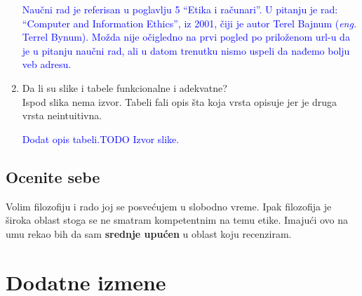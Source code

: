\documentclass[a4paper]{report}
\newcommand{\odgovor}[1]{\textcolor{blue}{#1}}
\begin{document}
\begin{enumerate}
\odgovor{Naučni rad je referisan u poglavlju 5 ``Etika i računari''. U pitanju je rad: ``Computer and Information Ethics'', iz 2001, čiji je autor Terel Bajnum (\textit{eng.} Terrel Bynum). Možda nije očigledno na prvi pogled po priloženom url-u da je u pitanju naučni rad, ali u datom trenutku nismo uspeli da nađemo bolju veb adresu.}

\item Da li su slike i tabele funkcionalne i adekvatne?\\
Ispod slika nema izvor. Tabeli fali opis šta koja vrsta opisuje jer je druga vrsta neintuitivna.

\odgovor{Dodat opis tabeli.TODO Izvor slike.}

\end{enumerate}

\section{Ocenite sebe}
Volim filozofiju i rado joj se posvećujem u slobodno vreme. Ipak filozofija je široka oblast stoga se ne smatram
kompetentnim na temu etike. Imajući ovo na umu rekao bih da sam \textbf{srednje upućen} u oblast koju recenziram.



\chapter{Dodatne izmene}
\end{document}
